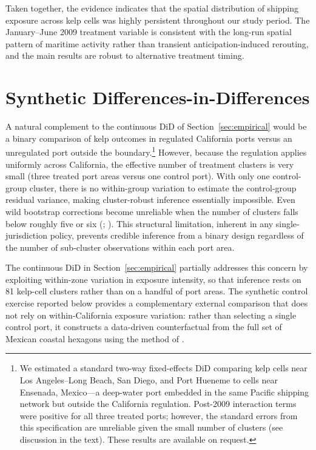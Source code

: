\documentclass[12pt]{article}
\begin{document}
Taken together, the evidence indicates that the spatial distribution of shipping exposure across kelp cells was highly persistent throughout our study period. The January--June 2009 treatment variable is consistent with the long-run spatial pattern of maritime activity rather than transient anticipation-induced rerouting, and the main results are robust to alternative treatment timing.

\newpage

\section{Synthetic Differences-in-Differences}\label{appendix_sc}

A natural complement to the continuous DiD of Section~\ref{sec:empirical} would be a binary comparison of kelp outcomes in regulated California ports versus an unregulated port outside the boundary.\footnote{We estimated a standard two-way fixed-effects DiD comparing kelp cells near Los Angeles--Long Beach, San Diego, and Port Hueneme to cells near Ensenada, Mexico---a deep-water port embedded in the same Pacific shipping network but outside the California regulation. Post-2009 interaction terms were positive for all three treated ports; however, the standard errors from this specification are unreliable given the small number of clusters (see discussion in the text). These results are available on request.} However, because the regulation applies uniformly across California, the effective number of treatment clusters is very small (three treated port areas versus one control port). With only one control-group cluster, there is no within-group variation to estimate the control-group residual variance, making cluster-robust inference essentially impossible. Even wild bootstrap corrections become unreliable when the number of clusters falls below roughly five or six (\citealp{Cameron2008}; \citealp{Cameron2015}). This structural limitation, inherent in any single-jurisdiction policy, prevents credible inference from a binary design regardless of the number of sub-cluster observations within each port area.

The continuous DiD in Section~\ref{sec:empirical} partially addresses this concern by exploiting within-zone variation in exposure intensity, so that inference rests on 81 kelp-cell clusters rather than on a handful of port areas. The synthetic control exercise reported below provides a complementary external comparison that does not rely on within-California exposure variation: rather than selecting a single control port, it constructs a data-driven counterfactual from the full set of Mexican coastal hexagons using the method of \citet{Arkhangelsky2021}.
\end{document}
